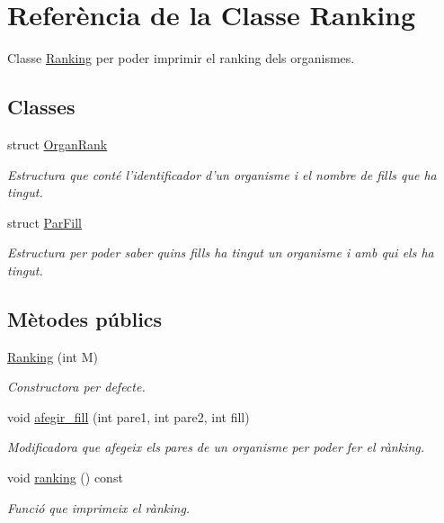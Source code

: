 \hypertarget{class_ranking}{\section{Referència de la Classe Ranking}
\label{class_ranking}
}


Classe \hyperlink{class_ranking}{Ranking} per poder imprimir el ranking dels organismes.  


\subsection*{Classes}
\begin{DoxyCompactItemize}
\item 
struct \hyperlink{struct_ranking_1_1_organ_rank}{Organ\-Rank}
\begin{DoxyCompactList}\small\item\em Estructura que conté l'identificador d'un organisme i el nombre de fills que ha tingut. \end{DoxyCompactList}\item 
struct \hyperlink{struct_ranking_1_1_par_fill}{Par\-Fill}
\begin{DoxyCompactList}\small\item\em Estructura per poder saber quins fills ha tingut un organisme i amb qui els ha tingut. \end{DoxyCompactList}\end{DoxyCompactItemize}
\subsection*{Mètodes públics}
\begin{DoxyCompactItemize}
\item 
\hyperlink{class_ranking_af700e3f1e24eb35173adff4fbcac7c68}{Ranking} (int M)
\begin{DoxyCompactList}\small\item\em Constructora per defecte. \end{DoxyCompactList}\item 
void \hyperlink{class_ranking_a15715ea90e6caf702490fd329bf5ec70}{afegir\-\_\-fill} (int pare1, int pare2, int fill)
\begin{DoxyCompactList}\small\item\em Modificadora que afegeix els pares de un organisme per poder fer el rànking. \end{DoxyCompactList}\item 
void \hyperlink{class_ranking_a2cb68818448b64432f2da6c7f3cfb446}{ranking} () const 
\begin{DoxyCompactList}\small\item\em Funció que imprimeix el rànking. \end{DoxyCompactList}\end{DoxyCompactItemize}
